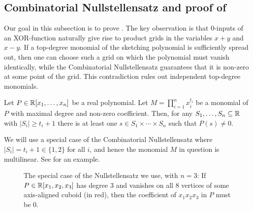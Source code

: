 \documentclass{article}
\begin{document}
\subsection{Combinatorial Nullstellensatz and proof of }
\label{subsection:xor-null-proof}

Our goal in this subsection is to prove . The key observation is that 0-inputs of an XOR-function naturally give rise to product grids in the variables $x+y$ and $x-y$. If a top-degree monomial of the sketching polynomial is sufficiently spread out, then one can choose such a grid on which the polynomial must vanish identically, while the Combinatorial Nullstellensatz guarantees that it is non-zero at some point of the grid. This contradiction rules out independent top-degree monomials.


\begin{boxtheorem}
\label{thm:nullstellensatz}
Let $P \in \mathbb{R}[x_1, \ldots, x_n]$ be a real polynomial. Let $M = \prod_{i = 1}^n x_i^{t_i}$ be a monomial of $P$ with maximal degree and non-zero coefficient. Then, for any $S_1, \ldots, S_n \subseteq \mathbb{R}$ with $|S_i| \geq t_i+1$ there is at least one $s \in S_1\times \cdots \times S_n$ such that $P(s) \ne 0$.
\end{boxtheorem}

We will use a special case of the Combinatorial Nullstellensatz where $|S_i| = t_i + 1 \in \{1, 2\}$ for all $i$, and hence the monomial $M$ in question is multilinear. See  for an example.

\begin{figure}[ht]
    \centering
    
    \vspace{-5mm}
    \caption{The special case of the Nullstellensatz we use, with $n = 3$: If $P\in \mathbb{R}[x_1,x_2,x_3]$ has degree $3$ and vanishes on all $8$ vertices of some axis-aligned cuboid (in red), then the coefficient of $x_1x_2x_3$ in $P$ must be $0$.}
    \label{fig:CN}
\end{figure}
\end{document}
